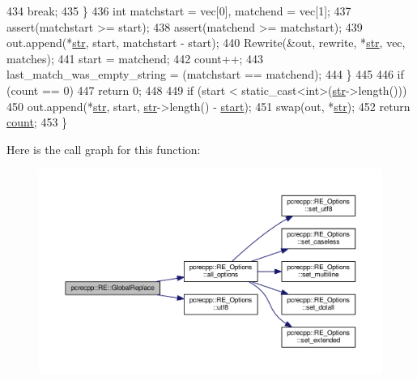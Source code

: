 \begin{DoxyCode}
434         \textcolor{keywordflow}{break};
435     \}
436     \textcolor{keywordtype}{int} matchstart = vec[0], matchend = vec[1];
437     assert(matchstart >= start);
438     assert(matchend >= matchstart);
439     out.append(*\hyperlink{group__MOD__DAV_gaab9226fe8f632e1f998e24276d478f30}{str}, start, matchstart - start);
440     Rewrite(&out, rewrite, *\hyperlink{group__MOD__DAV_gaab9226fe8f632e1f998e24276d478f30}{str}, vec, matches);
441     start = matchend;
442     count++;
443     last\_match\_was\_empty\_string = (matchstart == matchend);
444   \}
445 
446   \textcolor{keywordflow}{if} (count == 0)
447     \textcolor{keywordflow}{return} 0;
448 
449   \textcolor{keywordflow}{if} (start < static\_cast<int>(\hyperlink{group__MOD__DAV_gaab9226fe8f632e1f998e24276d478f30}{str}->length()))
450     out.append(*\hyperlink{group__MOD__DAV_gaab9226fe8f632e1f998e24276d478f30}{str}, start, \hyperlink{group__MOD__DAV_gaab9226fe8f632e1f998e24276d478f30}{str}->length() - \hyperlink{group__APACHE__CORE__DAEMON_ga6d3a995932cd00f6b3473898aa90d596}{start});
451   swap(out, *\hyperlink{group__MOD__DAV_gaab9226fe8f632e1f998e24276d478f30}{str});
452   \textcolor{keywordflow}{return} \hyperlink{group__APR__MD5_ga16ff2d8e15ade4948398b0aeb80124a8}{count};
453 \}
\end{DoxyCode}


Here is the call graph for this function\+:
\nopagebreak
\begin{figure}[H]
\begin{center}
\leavevmode
\includegraphics[width=350pt]{classpcrecpp_1_1RE_af176aba1f71bf5df3d05c7d736d39904_cgraph}
\end{center}
\end{figure}


